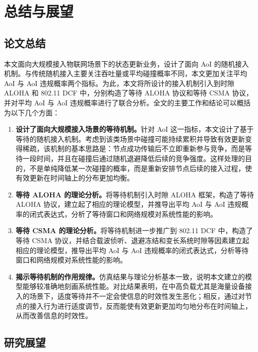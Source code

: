 \clearpage

\section{总结与展望}

\subsection{论文总结}

本文面向大规模接入物联网场景下的状态更新业务，设计了面向 AoI 的随机接入机制。与传统随机接入主要关注吞吐量或平均碰撞概率不同，本文更加关注平均 AoI 与 AoI 违规概率两个指标。为此，本文将所设计的接入机制引入到时隙 ALOHA 和 802.11 DCF 中，分别构造了等待 ALOHA 协议和等待 CSMA 协议，并对平均 AoI 与 AoI 违规概率进行了联合分析。全文的主要工作和结论可以概括为以下几个方面：
\begin{enumerate}[wide]
    \item \textbf{设计了面向大规模接入场景的等待机制。}针对 AoI 这一指标，本文设计了基于等待的随机接入机制。考虑到该类场景中碰撞可能持续累积并导致有效更新变得稀疏，该机制的基本思路是：节点成功传输后不立即重新参与竞争，而是等待一段时间，并且在碰撞后通过随机退避降低后续的竞争强度。这样处理的目的，不是单纯降低某一次碰撞的概率，而是重新安排节点后续的接入过程，使有效更新在时间轴上的分布更加均衡。

    \item \textbf{等待 ALOHA 的理论分析。}将等待机制引入时隙 ALOHA 框架，构造了等待 ALOHA 协议，建立起了相应的理论模型，并推导出平均 AoI 与 AoI 违规概率的闭式表达式，分析了等待窗口和网络规模对系统性能的影响。

    \item \textbf{等待 CSMA 的理论分析。}将等待机制进一步推广到 802.11 DCF 中，构造了等待 CSMA 协议，并结合载波侦听、退避冻结和变长系统时隙等因素建立起相应的理论模型，推导出平均 AoI 与 AoI 违规概率的闭式表达式，分析等待窗口和网络规模对系统性能的影响。

    \item \textbf{揭示等待机制的作用规律。}仿真结果与理论分析基本一致，说明本文建立的模型能够较准确地刻画系统性能。对比结果表明，在中高负载尤其是海量设备接入的场景下，适度等待并不一定会使信息的时效性发生恶化；相反，通过对节点的接入行为进行适度调节，反而能使有效更新更加均匀地分布在时间轴上，从而改善信息的时效性。
\end{enumerate}

\subsection{研究展望}


